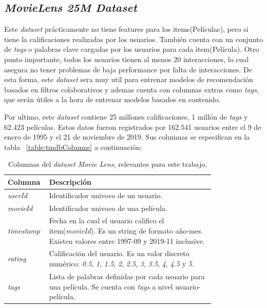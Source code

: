 \documentclass[11pt,a4paper,twoside]{thesis}
\begin{document}
\subsection{\textit{MovieLens 25M Dataset}}

Este \textit{dataset} \cite{movielens} prácticamente no tiene features para los items(Películas), pero si tiene la calificaciones realizadas por los usuarios. También cuenta con un conjunto de \textit{tags} o palabras clave cargadas por los usuarios para cada item(Película). Otro punto importante, todos los usuarios tienen al menos 20 interacciones, lo cual asegura no tener problemas de baja performance por falta de interacciones. 
De esta forma, este \textit{dataset} sera muy util para entrenar modelos de recomendación basados en filtros colaborativos
y ademas cuenta con columnas extras como \textit{tags}, que serán útiles a la hora de entrenar modelos basados en contenido.

Por ultimo, este \textit{dataset} contiene 25 millones calificaciones, 1 millón de \textit{tags} y 62.423 películas. Estos datos fueron registrados por 162.541 usuarios entre el 9 de enero de 1995 y el 21 de noviembre de 2019. Sus columnas se especifican en la tabla ~\ref{table:tmdbColumns} a continuación:


\begin{table}[!htb]
	\centering
	\footnotesize
	\begin{tabular}{l | p{0.8\linewidth}}
	\hline
		Columna         & Descripción \\
	\hline
	\textit{userId}     & Identificador univoco de un usuario.\\
	\textit{movieId}    & Identificador univoco de una película.\\
	\textit{timestamp}  & Fecha en la cual el usuario califico el item(\textit{movieId}). Es un string de formato año-mes. Existen valores entre 1997-09 y 2019-11 inclusive. \\
	\textit{rating}     & Calificación del usuario. Es un valor discreto numérico: \textit{0.5}, \textit{1}, \textit{1.5}, \textit{2}, \textit{2.5}, \textit{3}, \textit{3.5}, \textit{4}, \textit{4.5} y \textit{5}. \\
	\textit{tags}       & Lista de palabras definidas por cada usuario para una película. Se cuenta con \textit{tags} a nivel usuario-película. \\
	\hline
	\end{tabular}
	\caption{
		Columnas del \textit{dataset} \textit{Movie Lens}, relevantes para este trabajo.
	}
	\label{table:movieLensColumns}
\end{table}
\end{document}
